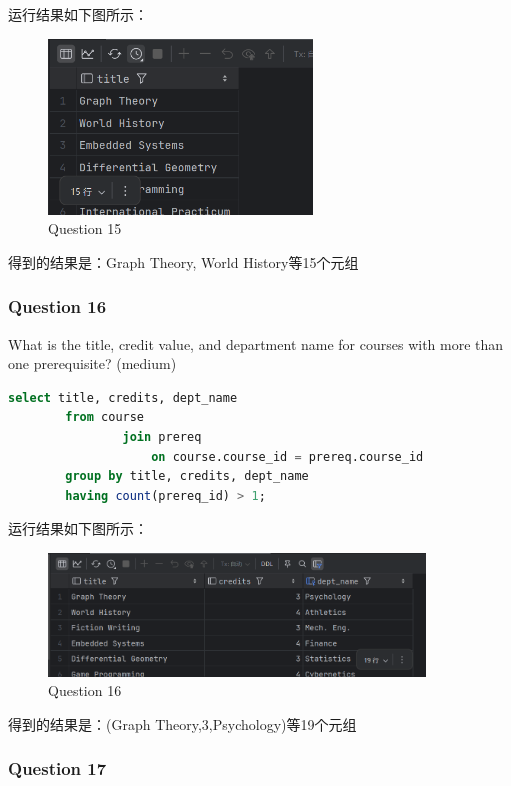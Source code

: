 \documentclass{article}
\begin{document}
    运行结果如下图所示：
    
    \begin{figure}[H] 
    	\centering 
    	\includegraphics[width=7cm]{./images/19.Question15.png} 
    	\caption{Question 15} 
    \end{figure}
    
    得到的结果是：Graph Theory, World History等15个元组
    
    \subsubsection{Question 16}
    
    What is the title, credit value, and department name for courses with more than one prerequisite?  (medium)
    
    \begin{lstlisting}[language=sql, title=Question 16, tabsize=4]
    	select title, credits, dept_name
    	from course
    			join prereq
    				on course.course_id = prereq.course_id
    	group by title, credits, dept_name
    	having count(prereq_id) > 1;
    \end{lstlisting}
    
    运行结果如下图所示：
    
    \begin{figure}[H]
    	\centering
    	\includegraphics[width=10cm]{./images/20.Question16.png}
    	\caption{Question 16}
    \end{figure}
    
    得到的结果是：(Graph Theory,3,Psychology)等19个元组
    
    \subsubsection{Question 17}
    
\end{document}
